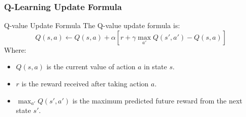 \documentclass{beamer}
\begin{document}
\begin{frame}[fragile]
    \frametitle{Q-Learning Update Formula}
    \begin{block}{Q-value Update Formula}
        The Q-value update formula is:
        \begin{equation}
            Q(s, a) \gets Q(s, a) + \alpha \left[ r + \gamma \max_{a'} Q(s', a') - Q(s, a) \right] 
        \end{equation}
        Where:
        \begin{itemize}
            \item $Q(s, a)$ is the current value of action $a$ in state $s$.
            \item $r$ is the reward received after taking action $a$.
            \item $\max_{a'} Q(s', a')$ is the maximum predicted future reward from the next state $s'$.
        \end{itemize}
    \end{block}
\end{frame}
\end{document}
